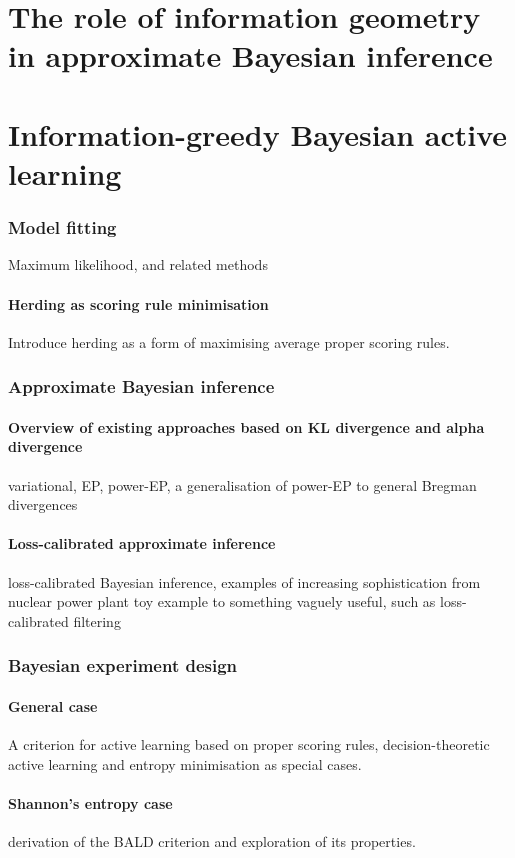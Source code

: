 \chapter[approximate inference]{The role of information geometry in approximate Bayesian inference}

\chapter{Information-greedy Bayesian active learning}


\subsection{Model fitting}
Maximum likelihood, and related methods
\subsubsection{Herding as scoring rule minimisation}
Introduce herding as a form of maximising average proper scoring rules.
\subsection{Approximate Bayesian inference}
\subsubsection{Overview of existing approaches based on KL divergence and alpha divergence}
variational, EP, power-EP, a generalisation of power-EP to general Bregman divergences
\subsubsection{Loss-calibrated approximate inference}
loss-calibrated Bayesian inference, examples of increasing sophistication from nuclear power plant toy example to something vaguely useful, such as loss-calibrated filtering
\subsection{Bayesian experiment design}
\subsubsection{General case}
A criterion for active learning based on proper scoring rules, decision-theoretic active learning and entropy minimisation as special cases.
\subsubsection{Shannon's entropy case}
derivation of the BALD criterion and exploration of its properties.
